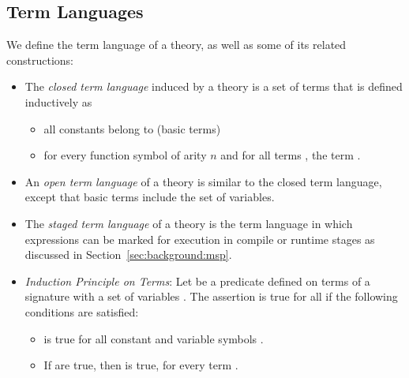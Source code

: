 \begin{itemize}
\end{itemize}

\subsection*{Term Languages}
We define the term language of a theory, as well as some of its related constructions:  
\begin{itemize}
   \item The \emph{closed term language}  induced by a theory is a set of terms that is defined inductively as 
    \begin{itemize}
        \item all constants belong to  (basic terms) 
        \item for every function symbol  of arity $n$ and for all terms  , the term . 
    \end{itemize}
    \item An \emph{open term language} of a theory is similar to the closed term language, except that basic terms include the set of variables.  
    \item The \emph{staged term language} of a theory is the term language in which expressions can be marked for execution in compile or runtime stages as discussed in Section~\ref{sec:background:msp}.  
    \item \emph{Induction Principle on Terms}: Let  be a predicate defined on terms  of a signature  with a set of variables . The assertion  is true for all  if the following conditions are satisfied: 
    \begin{itemize}
        \item {} is true for all constant and variable symbols .
        \item If  are true, then  is true, for every term .  

\end{itemize}
\end{itemize}
